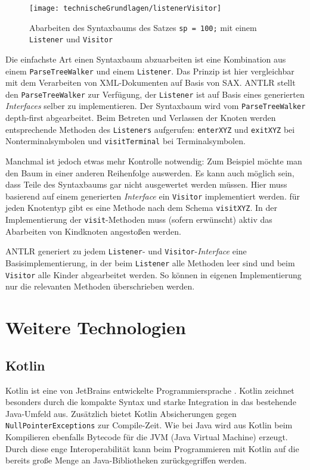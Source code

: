 \begin{figure}[]
    \centering
    \texttt{[image: technischeGrundlagen/listenerVisitor]}
    \caption{Abarbeiten des Syntaxbaums des Satzes \lstinline{sp = 100;} mit einem \lstinline{Listener} und \lstinline{Visitor} \cite{ANTLR4Reference}}
    \label{fig:listenerVisitor}
\end{figure}

Die einfachste Art einen Syntaxbaum abzuarbeiten ist eine Kombination aus einem \lstinline{ParseTreeWalker} und einem \lstinline{Listener}. Das Prinzip ist hier vergleichbar mit dem Verarbeiten von XML-Dokumenten auf Basis von SAX. ANTLR stellt den \lstinline{ParseTreeWalker} zur Verfügung, der \lstinline{Listener} ist auf Basis eines generierten \emph{Interfaces} selber zu implementieren. Der Syntaxbaum wird vom \lstinline{ParseTreeWalker} depth-first abgearbeitet. Beim Betreten und Verlassen der Knoten werden entsprechende Methoden des \lstinline{Listeners} aufgerufen: \lstinline{enterXYZ} und \lstinline{exitXYZ} bei Nonterminalsymbolen und \lstinline{visitTerminal} bei Terminalsymbolen.

Manchmal ist jedoch etwas mehr Kontrolle notwendig: Zum Beispiel möchte man den Baum in einer anderen Reihenfolge auswerden. Es kann auch möglich sein, dass Teile des Syntaxbaums gar nicht ausgewertet werden müssen. Hier muss basierend auf einem generierten \emph{Interface} ein \lstinline{Visitor} implementiert werden. für jeden Knotentyp gibt es eine Methode nach dem Schema \lstinline{visitXYZ}. In der Implementierung der \lstinline{visit}-Methoden muss (sofern erwünscht) aktiv das Abarbeiten von Kindknoten angestoßen werden.

ANTLR generiert zu jedem \lstinline{Listener}- und \lstinline{Visitor}-\emph{Interface} eine Basisimplementierung, in der beim \lstinline{Listener} alle Methoden leer sind und beim \lstinline{Visitor} alle Kinder abgearbeitet werden. So können in eigenen Implementierung nur die relevanten Methoden überschrieben werden.

\section{Weitere Technologien}
\subsection{Kotlin}
Kotlin ist eine von JetBrains entwickelte Programmiersprache \cite{KotlinReference}. Kotlin zeichnet besonders durch die kompakte Syntax und starke Integration in das bestehende Java-Umfeld aus. Zusätzlich bietet Kotlin Absicherungen gegen \lstinline{NullPointerExceptions} zur Compile-Zeit. Wie bei Java wird aus Kotlin beim Kompilieren ebenfalls Bytecode für die JVM (Java Virtual Machine) erzeugt. Durch diese enge Interoperabilität kann beim Programmieren mit Kotlin auf die bereits große Menge an Java-Bibliotheken zurückgegriffen werden.

